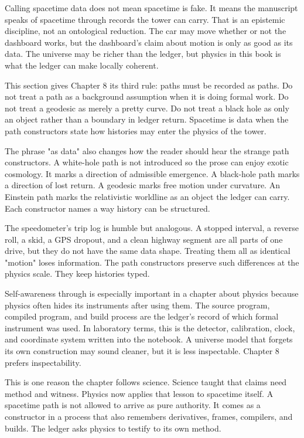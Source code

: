 Calling spacetime data does not mean spacetime is fake. It means the manuscript
speaks of spacetime through records the tower can carry. That is an epistemic
discipline, not an ontological reduction. The car may move whether or not the
dashboard works, but the dashboard's claim about motion is only as good as its
data. The universe may be richer than the ledger, but physics in this book is
what the ledger can make locally coherent.

This section gives Chapter 8 its third rule: paths must be recorded as paths.
Do not treat a path as a background assumption when it is doing formal work. Do
not treat a geodesic as merely a pretty curve. Do not treat a black hole as
only an object rather than a boundary in ledger return. Spacetime is data when
the path constructors state how histories may enter the physics of the tower.

The phrase "as data" also changes how the reader should hear the strange path
constructors. A white-hole path is not introduced so the prose can enjoy exotic
cosmology. It marks a direction of admissible emergence. A black-hole path
marks a direction of lost return. A geodesic marks free motion under curvature.
An Einstein path marks the relativistic worldline as an object the ledger can
carry. Each constructor names a way history can be structured.

The speedometer's trip log is humble but analogous. A stopped interval, a
reverse roll, a skid, a GPS dropout, and a clean highway segment are all parts
of one drive, but they do not have the same data shape. Treating them all as
identical "motion" loses information. The path constructors preserve such
differences at the physics scale. They keep histories typed.

Self-awareness through  is especially important in a chapter
about physics because physics often hides its instruments after using them.
The source program, compiled program, and build process are the ledger's record
of which formal instrument was used. In laboratory terms, this is the detector,
calibration, clock, and coordinate system written into the notebook. A universe
model that forgets its own construction may sound cleaner, but it is less
inspectable. Chapter 8 prefers inspectability.

This is one reason the chapter follows science. Science taught that claims
need method and witness. Physics now applies that lesson to spacetime itself.
A spacetime path is not allowed to arrive as pure authority. It comes as a
constructor in a process that also remembers derivatives, frames, compilers,
and builds. The ledger asks physics to testify to its own method.

